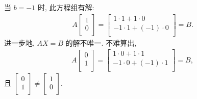 \begin{example}
    当 \(b = -1\) 时, 此方程组有解:
    \begin{align*}
        A
        \begin{bmatrix}
            1 \\
            0 \\
        \end{bmatrix}
        =
        \begin{bmatrix}
            1 \cdot 1 + 1 \cdot 0     \\
            -1 \cdot 1 + (-1) \cdot 0 \\
        \end{bmatrix}
        =
        B.
    \end{align*}
    进一步地, \(AX = B\) 的解不唯一.
    不难算出,
    \begin{align*}
        A
        \begin{bmatrix}
            0 \\
            1 \\
        \end{bmatrix}
        =
        \begin{bmatrix}
            1 \cdot 0 + 1 \cdot 1     \\
            -1 \cdot 0 + (-1) \cdot 1 \\
        \end{bmatrix}
        =
        B,
    \end{align*}
    且
    \(
    \begin{bmatrix}
        0 \\
        1 \\
    \end{bmatrix}
    \neq
    \begin{bmatrix}
        1 \\
        0 \\
    \end{bmatrix}
    \).


\end{example}
